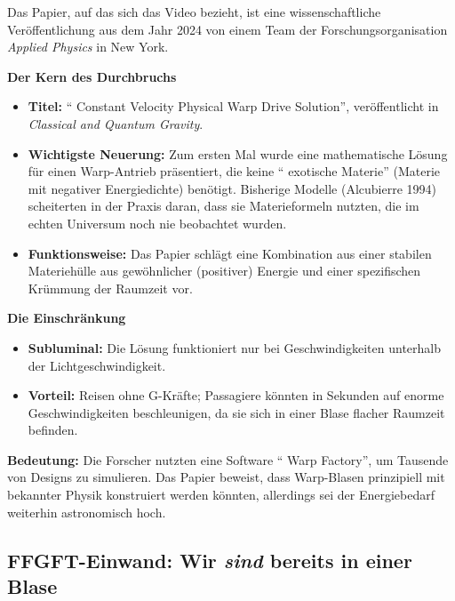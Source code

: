 \begin{geminibox}
Das Papier, auf das sich das Video bezieht, ist eine wissenschaftliche Ver\"offentlichung aus dem Jahr 2024 von einem Team der Forschungsorganisation \emph{Applied Physics} in New York.

\textbf{Der Kern des Durchbruchs}
\begin{itemize}[leftmargin=1.2em]
  \item \textbf{Titel:} \textquotedblleft{} Constant Velocity Physical Warp Drive Solution\textquotedblright{}, ver\"offentlicht in \emph{Classical and Quantum Gravity}.
  \item \textbf{Wichtigste Neuerung:} Zum ersten Mal wurde eine mathematische L\"osung f\"ur einen Warp-Antrieb pr\"asentiert, die keine \textquotedblleft{} exotische Materie\textquotedblright{}{} (Materie mit negativer Energiedichte) ben\"otigt. Bisherige Modelle (Alcubierre 1994) scheiterten in der Praxis daran, dass sie Materieformeln nutzten, die im echten Universum noch nie beobachtet wurden.
  \item \textbf{Funktionsweise:} Das Papier schl\"agt eine Kombination aus einer stabilen Materieh\"ulle aus gew\"ohnlicher (positiver) Energie und einer spezifischen Kr\"ummung der Raumzeit vor.
\end{itemize}

\textbf{Die Einschr\"ankung}
\begin{itemize}[leftmargin=1.2em]
  \item \textbf{Subluminal:} Die L\"osung funktioniert nur bei Geschwindigkeiten unterhalb der Lichtgeschwindigkeit.
  \item \textbf{Vorteil:} Reisen ohne G-Kr\"afte; Passagiere k\"onnten in Sekunden auf enorme Geschwindigkeiten beschleunigen, da sie sich in einer Blase flacher Raumzeit befinden.
\end{itemize}

\textbf{Bedeutung:} Die Forscher nutzten eine Software \textquotedblleft{} Warp Factory\textquotedblright{}, um Tausende von Designs zu simulieren. Das Papier beweist, dass Warp-Blasen prinzipiell mit bekannter Physik konstruiert werden k\"onnten, allerdings sei der Energiebedarf weiterhin astronomisch hoch.
\end{geminibox}

\subsection{FFGFT-Einwand: Wir \emph{sind} bereits in einer Blase}

